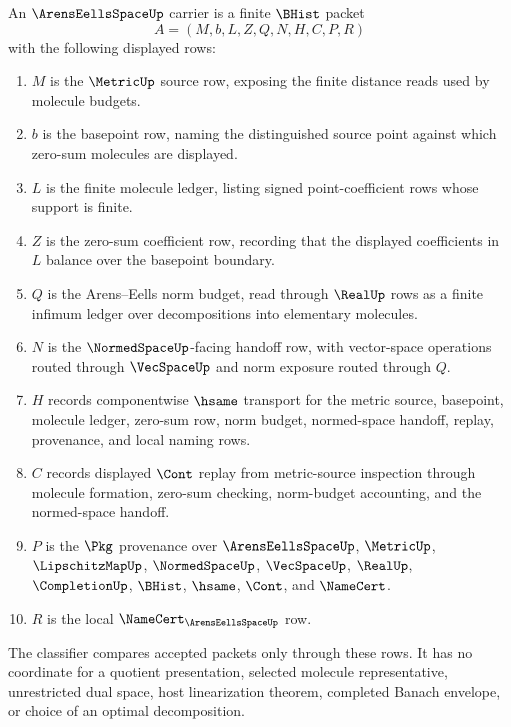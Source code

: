 \begin{definition}
\label{def:arens-eells-space-carrier}
An $\ArensEellsSpaceUp$ carrier is a finite $\BHist$ packet
$$
A=(M,b,L,Z,Q,N,H,C,P,R)
$$
with the following displayed rows:
\begin{enumerate}
\item $M$ is the $\MetricUp$ source row, exposing the finite distance reads used by molecule budgets.
\item $b$ is the basepoint row, naming the distinguished source point against which zero-sum molecules are displayed.
\item $L$ is the finite molecule ledger, listing signed point-coefficient rows whose support is finite.
\item $Z$ is the zero-sum coefficient row, recording that the displayed coefficients in $L$ balance over the basepoint boundary.
\item $Q$ is the Arens--Eells norm budget, read through $\RealUp$ rows as a finite infimum ledger over decompositions into elementary molecules.
\item $N$ is the $\NormedSpaceUp$-facing handoff row, with vector-space operations routed through $\VecSpaceUp$ and norm exposure routed through $Q$.
\item $H$ records componentwise $\hsame$ transport for the metric source, basepoint, molecule ledger, zero-sum row, norm budget, normed-space handoff, replay, provenance, and local naming rows.
\item $C$ records displayed $\Cont$ replay from metric-source inspection through molecule formation, zero-sum checking, norm-budget accounting, and the normed-space handoff.
\item $P$ is the $\Pkg$ provenance over $\ArensEellsSpaceUp$, $\MetricUp$, $\LipschitzMapUp$, $\NormedSpaceUp$, $\VecSpaceUp$, $\RealUp$, $\CompletionUp$, $\BHist$, $\hsame$, $\Cont$, and $\NameCert$.
\item $R$ is the local $\NameCert_{\ArensEellsSpaceUp}$ row.
\end{enumerate}
The classifier compares accepted packets only through these rows. It has no coordinate for a quotient presentation, selected molecule representative, unrestricted dual space, host linearization theorem, completed Banach envelope, or choice of an optimal decomposition.
\end{definition}

